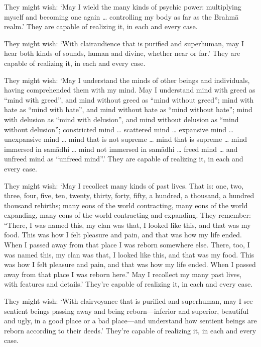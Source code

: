 \documentclass[12pt,openany]{book}%
\begin{document}
They might wish: ‘May I wield the many kinds of psychic power: multiplying myself and becoming one again … controlling my body as far as the \textsanskrit{Brahmā} realm.’ They are capable of realizing it, in each and every case. 

They might wish: ‘With clairaudience that is purified and superhuman, may I hear both kinds of sounds, human and divine, whether near or far.’ They are capable of realizing it, in each and every case. 

They might wish: ‘May I understand the minds of other beings and individuals, having comprehended them with my mind. May I understand mind with greed as “mind with greed”, and mind without greed as “mind without greed”; mind with hate as “mind with hate”, and mind without hate as “mind without hate”; mind with delusion as “mind with delusion”, and mind without delusion as “mind without delusion”; constricted mind … scattered mind … expansive mind … unexpansive mind … mind that is not supreme … mind that is supreme … mind immersed in \textsanskrit{samādhi} … mind not immersed in \textsanskrit{samādhi} … freed mind … and unfreed mind as “unfreed mind”.’ They are capable of realizing it, in each and every case. 

They might wish: ‘May I recollect many kinds of past lives. That is: one, two, three, four, five, ten, twenty, thirty, forty, fifty, a hundred, a thousand, a hundred thousand rebirths; many eons of the world contracting, many eons of the world expanding, many eons of the world contracting and expanding. They remember: “There, I was named this, my clan was that, I looked like this, and that was my food. This was how I felt pleasure and pain, and that was how my life ended. When I passed away from that place I was reborn somewhere else. There, too, I was named this, my clan was that, I looked like this, and that was my food. This was how I felt pleasure and pain, and that was how my life ended. When I passed away from that place I was reborn here.” May I recollect my many past lives, with features and details.’ They’re capable of realizing it, in each and every case. 

They might wish: ‘With clairvoyance that is purified and superhuman, may I see sentient beings passing away and being reborn—inferior and superior, beautiful and ugly, in a good place or a bad place—and understand how sentient beings are reborn according to their deeds.’ They’re capable of realizing it, in each and every case. 
\end{document}
